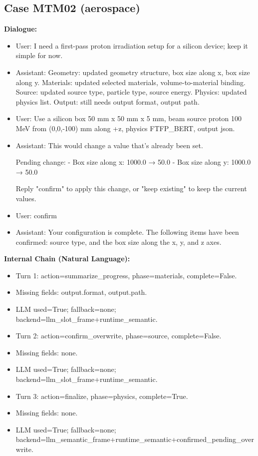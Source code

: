\documentclass[11pt]{ctexart}
\begin{document}
\subsection{Case MTM02 (aerospace)}
\textbf{Dialogue:}
\begin{itemize}
\item User: I need a first-pass proton irradiation setup for a silicon device; keep it simple for now.
\item Assistant: Geometry: updated geometry structure, box size along x, box size along y. Materials: updated selected materials, volume-to-material binding. Source: updated source type, particle type, source energy. Physics: updated physics list. Output: still needs output format, output path.
\item User: Use a silicon box 50 mm x 50 mm x 5 mm, beam source proton 100 MeV from (0,0,-100) mm along +z, physics FTFP\_BERT, output json.
\item Assistant: This would change a value that's already been set.

Pending change:
- Box size along x: 1000.0 → 50.0
- Box size along y: 1000.0 → 50.0

Reply "confirm" to apply this change, or "keep existing" to keep the current values.
\item User: confirm
\item Assistant: Your configuration is complete. The following items have been confirmed: source type, and the box size along the x, y, and z axes.
\end{itemize}
\textbf{Internal Chain (Natural Language):}
\begin{itemize}
\item Turn 1: action=summarize\_progress, phase=materials, complete=False.
\item Missing fields: output.format, output.path.
\item LLM used=True; fallback=none; backend=llm\_slot\_frame+runtime\_semantic.
\item Turn 2: action=confirm\_overwrite, phase=source, complete=False.
\item Missing fields: none.
\item LLM used=True; fallback=none; backend=llm\_slot\_frame+runtime\_semantic.
\item Turn 3: action=finalize, phase=physics, complete=True.
\item Missing fields: none.
\item LLM used=True; fallback=none; backend=llm\_semantic\_frame+runtime\_semantic+confirmed\_pending\_overwrite.
\end{itemize}
\end{document}
